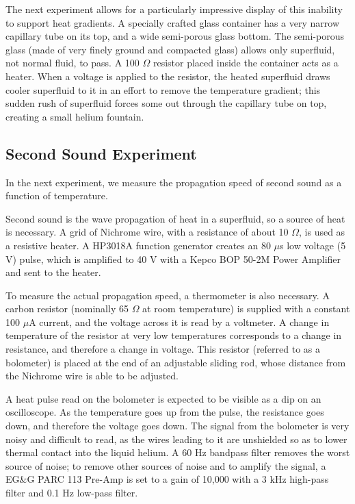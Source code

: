 The next experiment allows for a particularly impressive display of this inability to support heat gradients. A specially crafted glass container has a very narrow capillary tube on its top, and a wide semi-porous glass bottom. The semi-porous glass (made of very finely ground and compacted glass) allows only superfluid, not normal fluid, to pass. A 100 $\Omega$ resistor placed inside the container acts as a heater. When a voltage is applied to the resistor, the heated superfluid draws cooler superfluid to it in an effort to remove the temperature gradient; this sudden rush of superfluid forces some out through the capillary tube on top, creating a small helium fountain.

\subsection{Second Sound Experiment}

In the next experiment, we measure the propagation speed of second sound as a function of temperature.

Second sound is the wave propagation of heat in a superfluid, so a source of heat is necessary. A grid of Nichrome wire, with a resistance of about 10 $\Omega$, is used as a resistive heater. A HP3018A function generator creates an 80 $\mu$s low voltage (5 V) pulse, which is amplified to 40 V with a Kepco BOP 50-2M Power Amplifier and sent to the heater. 

To measure the actual propagation speed, a thermometer is also necessary. A carbon resistor (nominally 65 $\Omega$ at room temperature) is supplied with a constant 100 $\mu$A current, and the voltage across it is read by a voltmeter. A change in temperature of the resistor at very low temperatures corresponds to a change in resistance, and therefore a change in voltage. This resistor (referred to as a bolometer) is placed at the end of an adjustable sliding rod, whose distance from the Nichrome wire is able to be adjusted.

A heat pulse read on the bolometer is expected to be visible as a dip on an oscilloscope. As the temperature goes up from the pulse, the resistance goes down, and therefore the voltage goes down. The signal from the bolometer is very noisy and difficult to read, as the wires leading to it are unshielded so as to lower thermal contact into the liquid helium. A 60 Hz bandpass filter removes the worst source of noise; to remove other sources of noise and to amplify the signal, a EG\&G PARC 113 Pre-Amp is set to a gain of 10,000 with a 3 kHz high-pass filter and 0.1 Hz low-pass filter.

